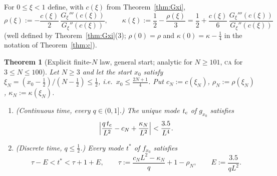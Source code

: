 \documentclass[11pt,a4paper]{article}
\newtheorem{theorem}{Theorem}[section]
\theoremstyle{definition}
\theoremstyle{remark}
\newcommand{\CA}{\textsc{ca}}
\begin{document}
For $0\le\xi<1$ define, with $c(\xi)$ from Theorem~\ref{thm:Gxi},
\begin{equation}\label{eq:rhokappaxi}
  \rho(\xi):=-\frac{c(\xi)}2\,\frac{G_\xi'''(c(\xi))}{G_\xi''(c(\xi))},\qquad
  \kappa(\xi):=\frac12-\frac{\rho(\xi)}3=\frac12+\frac{c(\xi)}6\,\frac{G_\xi'''(c(\xi))}{G_\xi''(c(\xi))}
\end{equation}
(well defined by Theorem~\ref{thm:Gxi}(3); $\rho(0)=\rho$ and $\kappa(0)=\kappa-\frac14$ in the notation of
Theorem~\ref{thm:c}).

\begin{theorem}[Explicit finite-$N$ law, general start; analytic for $N\ge101$, \CA{} for $3\le N\le100$]\label{thm:startexp}
Let $N\ge3$ and let the start $x_0$ satisfy $\xi_N=(x_0-\frac12)/(N-\frac12)\le\frac12$, i.e.\ $x_0\le\frac{2N+1}4$. Put
$c_N:=c(\xi_N)$, $\rho_N:=\rho(\xi_N)$, $\kappa_N:=\kappa(\xi_N)$.
\begin{enumerate}
\item (Continuous time, every $q\in(0,1]$.) The unique mode $t_{\rm c}$ of $g_{x_0}$ satisfies
\[
   \Bigl|\frac{q\,t_{\rm c}}{L^2}-c_N+\frac{\kappa_N}{L^2}\Bigr|<\frac{3.5}{L^4} .
\]
\item (Discrete time, $q\le\frac12$.) Every mode $t^*$ of $f_{x_0}$ satisfies
\[
   \tau-E<t^*<\tau+1+E,\qquad \tau:=\frac{c_NL^2-\kappa_N}q+1-\rho_N,\qquad E:=\frac{3.5}{qL^2}.
\]
\end{enumerate}
\end{theorem}
\end{document}
